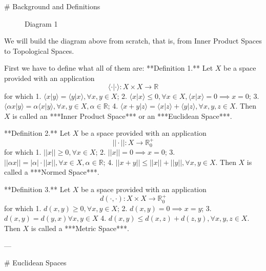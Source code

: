 \documentclass{article}
\begin{document}
# Background and Definitions

\begin{figure}[h!]
\centering

\caption{Diagram 1}
\end{figure}


We will build the diagram above from scratch, that is, from Inner Product Spaces to Topological Spaces. 

First we have to define what all of them are:
**Definition 1.** Let $X$  be a space provided with an application $$\langle \cdot | \cdot \rangle :X\times X\to \mathbb{R}$$
	for which
		1. $\langle x | y \rangle = \langle y | x \rangle, \forall x,y\in X$;
		2. $\langle x | x \rangle \leq 0, \forall x \in X, \langle x | x \rangle =0 \implies x=0$;
		3. $\langle \alpha x | y \rangle= \alpha \langle x | y \rangle, \forall x,y \in X, \alpha \in \mathbb{R}$;
		4. $\langle x+y | z \rangle= \langle x | z \rangle+\langle y | z \rangle, \forall x,y,z \in X$.
Then $X$ is called an ***Inner Product Space*** or an ***Euclidean Space***.

**Definition 2.** Let $X$ be a space provided with an application$$||\cdot||: X \to \mathbb{R}^+_{0}$$for which 
	1. $||x||\geq 0, \forall x \in X$;
	2. $||x||=0 \implies x=0$;
	3. $||\alpha x||= |\alpha| \cdot ||x||, \forall x \in X, \alpha \in \mathbb{R}$;
	4. $||x+y||\leq ||x||+||y||,\forall x,y \in X$.
Then $X$ is called a ***Normed Space***.

**Definition 3.** Let $X$ be a space provided with an application$$d(\cdot,\cdot): X\times X \to \mathbb{R}^+_{0}$$for which 
	1. $d(x,y)\geq 0, \forall x,y \in X$;
	2. $d(x,y)=0 \implies x=y$;
	3. $d(x,y)=d(y,x) \forall x,y \in X$
	4. $d(x,y)\leq d(x,z)+d(z,y),\forall x,y,z \in X$.
Then $X$ is called a ***Metric Space***.

---

# Euclidean Spaces
\end{document}
